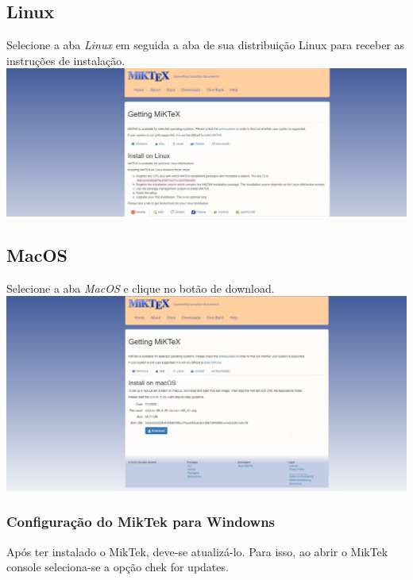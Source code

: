 \documentclass[
]{book}
\begin{document}
\hypertarget{linux}{%
\subsection{Linux}\label{linux}}

Selecione a aba \emph{Linux} em seguida a aba de sua distribuição Linux para receber as instruções de instalação.
\includegraphics{img/download_linux_MiKTex.jpg}

\hypertarget{macos}{%
\subsection{MacOS}\label{macos}}

Selecione a aba \emph{MacOS} e clique no botão de download.
\includegraphics{img/download_macOS_MiKTex.jpg}

\hypertarget{configurauxe7uxe3o-do-miktek-para-windowns}{%
\subsubsection{Configuração do MikTek para Windowns}\label{configurauxe7uxe3o-do-miktek-para-windowns}}

Após ter instalado o MikTek, deve-se atualizá-lo. Para isso, ao abrir o MikTek console seleciona-se a opção chek for updates.
\end{document}
